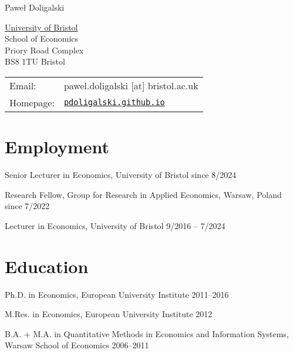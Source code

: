 \documentclass[letterpaper]{article}
\def\name{Pawe\l{} Doligalski}
\renewenvironment{itemize}{
  \begin{list}{}{
    \setlength{\leftmargin}{1.5em}
  }
}{
  \end{list}
}
\begin{document}
{\huge \name}


\vspace{0.25in}

\begin{minipage}{0.45\linewidth}
  \href{http://www.unc.edu/}{University of Bristol} \\
  School of Economics \\
  Priory Road Complex \\
  BS8 1TU Bristol
\end{minipage}
\begin{minipage}{0.45\linewidth}
  \begin{tabular}{ll}
    Email: & pawel.doligalski [at] bristol.ac.uk \\
    Homepage: & \href{http://pdoligalski.github.io}{\tt pdoligalski.github.io} \\
  \end{tabular}
\end{minipage}

\section*{Employment}

\begin{itemize}
\item Senior Lecturer in Economics, University of Bristol \hfill since 8/2024

\item Research Fellow, Group for Research in Applied Economics, Warsaw, Poland \hfill since 7/2022

\item Lecturer in Economics, University of Bristol \hfill 9/2016 -- 7/2024 

\end{itemize}


\section*{Education}

\begin{itemize}
  \item Ph.D. in Economics, European University Institute \hfill 2011--2016

  \item M.Res. in Economics, European University Institute \hfill 2012

  \item{B.A. + M.A. in Quantitative Methods in Economics and Information Systems,\\
   \indent \hspace{8cm} Warsaw School of Economics \hfill 2006--2011}


\end{itemize}
\end{document}
